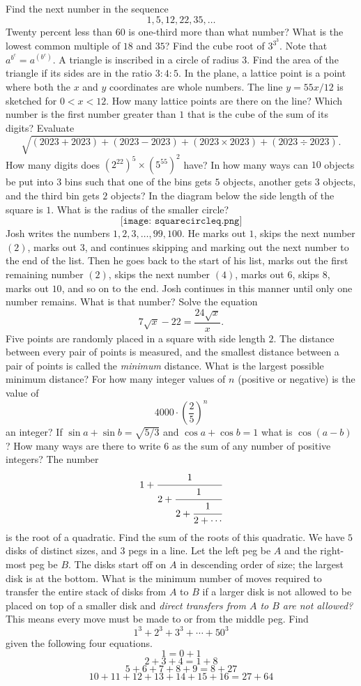 \documentclass[a4paper,12pt]{exam}
\begin{document}
\begin{questions}
  \question Find the next number in the sequence \[1,5,12,22,35,\ldots\]
  \question Twenty percent less than $60$ is one-third more than what number?
  \question What is the lowest common multiple of \(18\) and \(35\)?
  \question Find the cube root of \(3^{3^3}\). Note that \(a^{b^c}=a^{(b^c)}\).
  \question A triangle is inscribed in a circle of radius \(3\). Find the area
  of the triangle if its sides are in the ratio \(3:4:5\).
  \question In the plane, a lattice point is a point where both the \(x\)
  and \(y\) coordinates are whole numbers. The line \(y=55x/12\) is sketched
  for \(0<x<12\). How many lattice points are there on the line?
  \question Which number is the first number greater than \(1\) that is the cube of the sum of its digits?
  \question Evaluate \[\sqrt{(2023+2023)+(2023-2023)+(2023\times2023)+(2023\div2023)}.\]
  \question How many digits does \((2^22)^5\times(5^55)^2\) have?
  \question In how many ways can \(10\) objects be put into \(3\) bins
  such that one of the bins gets \(5\) objects, another gets \(3\) objects,
  and the third bin gets \(2\) objects?
  \question In the diagram below the side length of the square is \(1\).
  What is the radius of the smaller circle?
\[  \texttt{[image: squarecircleq.png]}\]
\question Josh writes the numbers $1,2,3,\dots,99,100$. He marks out $1$, skips the next number $(2)$, marks out $3$, and continues skipping and marking out the next number to the end of the list. Then he goes back to the start of his list, marks out the first remaining number $(2)$, skips the next number $(4)$, marks out $6$, skips $8$, marks out $10$, and so on to the end. Josh continues in this manner until only one number remains. What is that number?
\question Solve the equation \[7\sqrt x-22=\frac{24\sqrt x}{x}.\]
\question Five points are randomly placed in a square with side length \(2\).
The distance between every pair of points is measured, and the smallest
distance between a pair of points is called the \emph{minimum} distance. What
is the largest possible minimum distance?
\question For how many integer values of \(n\) (positive or negative) is the value of \[4000\cdot \left(\frac{2}{5}\right)^n\] an integer?
  \question If \(\sin a+\sin b=\sqrt{5/3}\) and \(\cos a+\cos b=1\) what is \(\cos(a-b)\)?
  \question How many ways are there to write \(6\) as the sum of any number
  of positive integers?
  \question The number \[1+\cfrac{1}{2+\cfrac{1}{2+\cfrac{1}{2+\cdots}}}\] is the root of a quadratic. Find the sum of the roots of this quadratic.
    \question
  We have \(5\) disks of distinct sizes, and \(3\) pegs in a line. Let the left
  peg be \(A\) and the right-most peg be \(B\). The disks start off on \(A\) in
  descending order of size; the largest disk is at the bottom. What is the minimum
  number of moves required to transfer the entire stack of disks from \(A\) to \(B\)
  if a larger disk is not allowed to be placed on top of a smaller disk and \emph{direct
    transfers from \(A\) to \(B\) are not allowed?} This means every move must be made
  to or from the middle peg.
    \question Find \[1^3+2^3+3^3+\cdots+50^3\] given the following four
  equations. \[1 = 0 + 1\]\[2+3+4=1+8\] \[5+6+7+8+9=8+27\] \[10+11+12+13+14
    +15+16=27+64\]


\end{questions}
\end{document}
